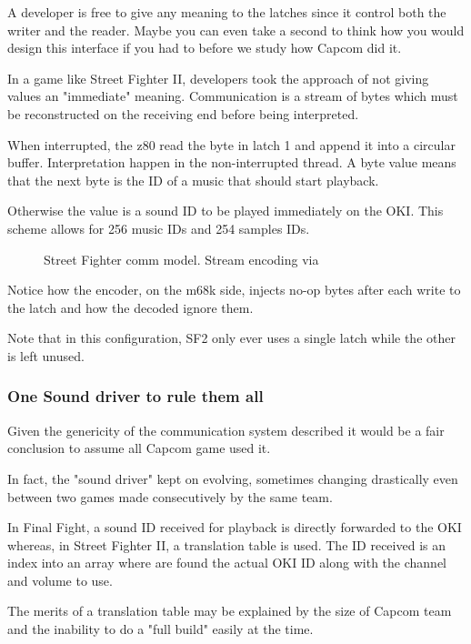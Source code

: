 A developer is free to give any meaning to the latches since it control both the writer and the reader. Maybe you can even take a second to think how you would design this interface if you had to before we study how Capcom did it.

In a game like Street Fighter II, developers took the approach of not giving values an "immediate" meaning. Communication is a stream of bytes which must be reconstructed on the receiving end before being interpreted.



When interrupted, the z80 read the byte in latch 1 and append it into a circular buffer. Interpretation happen in the non-interrupted thread. A byte value  means that the next byte is the ID of a music that should start playback. 

Otherwise the value is a sound ID to be played immediately on the OKI. This scheme allows for 256 music IDs and 254 samples IDs.

 \begin{figure}[H]
\caption*{Street Fighter comm model. Stream encoding via }
\end{figure}

Notice how the encoder, on the m68k side, injects  no-op bytes after each write to the latch and how the decoded ignore them.

Note that in this configuration, SF2 only ever uses a single latch while the other is left unused.

\subsubsection{One Sound driver to rule them all}

Given the genericity of the communication system described it would be a fair conclusion to assume all Capcom game used it.

In fact, the "sound driver" kept on evolving, sometimes changing drastically even between two games made consecutively by the same team. 

In Final Fight, a sound ID received for playback is directly forwarded to the OKI whereas, in Street Fighter II, a translation table is used. The ID received is an index into an array where are found the actual OKI ID along with the channel and volume to use.

The merits of a translation table may be explained by the size of Capcom team and the inability to do a "full build" easily at the time.


